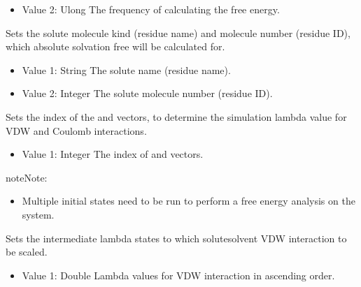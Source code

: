 \documentclass[letterpaper,10pt,english]{sphinxmanual}
\begin{document}
\begin{description}
\begin{description}
\begin{itemize}
\item {} 
\sphinxAtStartPar
Value 2: Ulong \sphinxhyphen{} The frequency of calculating the free energy.

\end{itemize}

\item[{\sphinxcode{\sphinxupquote{MoleculeType}}}] \leavevmode
\sphinxAtStartPar
Sets the solute molecule kind (residue name) and molecule number (residue ID), which absolute solvation free will be calculated for.
\begin{itemize}
\item {} 
\sphinxAtStartPar
Value 1: String \sphinxhyphen{} The solute name (residue name).

\item {} 
\sphinxAtStartPar
Value 2: Integer \sphinxhyphen{} The solute molecule number (residue ID).

\end{itemize}

\item[{\sphinxcode{\sphinxupquote{InitialState}}}] \leavevmode
\sphinxAtStartPar
Sets the index of the  and  vectors, to determine the simulation lambda value for VDW and Coulomb interactions.
\begin{itemize}
\item {} 
\sphinxAtStartPar
Value 1: Integer \sphinxhyphen{} The index of  and  vectors.

\end{itemize}

\begin{sphinxadmonition}{note}{Note:}\begin{itemize}
\item {} 
\sphinxAtStartPar
Multiple initial states need to be run to perform a free energy analysis on the system.

\end{itemize}
\end{sphinxadmonition}

\item[{\sphinxcode{\sphinxupquote{LambdaVDW}}}] \leavevmode
\sphinxAtStartPar
Sets the intermediate lambda states to which solute\sphinxhyphen{}solvent VDW interaction to be scaled.
\begin{itemize}
\item {} 
\sphinxAtStartPar
Value 1: Double \sphinxhyphen{} Lambda values for VDW interaction in ascending order.


\end{itemize}
\end{description}
\end{description}
\end{document}
